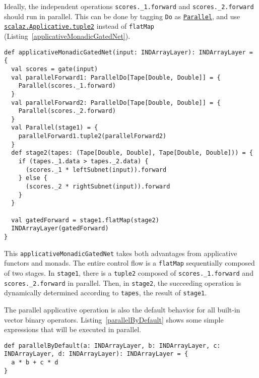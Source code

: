 Ideally, the independent operations \lstinline{scores._1.forward} and \lstinline{scores._2.forward} should run in parallel. This can be done by tagging \lstinline{Do} as \href{https://javadoc.io/page/org.scalaz/scalaz_2.11/latest/scalaz/Tags%24%24Parallel.html}{\lstinline{Parallel}}, and use \href{https://javadoc.io/page/org.scalaz/scalaz_2.11/latest/scalaz/Applicative.html#tuple2[A,B](fa:=>F[A],fb:=>F[B]):F[(A,B)]}{\lstinline{scalaz.Applicative.tuple2}} \cite{mcbride2008applicative} instead of \lstinline{flatMap} (Listing~\ref{applicativeMonadicGatedNet}).

\begin{lstlisting}[float={h t b p},caption={Applicative + monadic gated network}, label={applicativeMonadicGatedNet}]
def applicativeMonadicGatedNet(input: INDArrayLayer): INDArrayLayer = {
  val scores = gate(input)
  val parallelForward1: ParallelDo[Tape[Double, Double]] = {
    Parallel(scores._1.forward)
  }
  val parallelForward2: ParallelDo[Tape[Double, Double]] = {
    Parallel(scores._2.forward)
  }
  val Parallel(stage1) = {
  	parallelForward1.tuple2(parallelForward2)
  }
  def stage2(tapes: (Tape[Double, Double], Tape[Double, Double])) = {
    if (tapes._1.data > tapes._2.data) {
      (scores._1 * leftSubnet(input)).forward
    } else {
      (scores._2 * rightSubnet(input)).forward
    }
  }

  val gatedForward = stage1.flatMap(stage2)
  INDArrayLayer(gatedForward)
}
\end{lstlisting}

This \lstinline{applicativeMonadicGatedNet} takes both advantages from applicative functors and monads. The entire control flow is a \lstinline{flatMap} sequentially composed of two stages. In \lstinline{stage1}, there is a \lstinline{tuple2} composed of \lstinline{scores._1.forward} and \lstinline{scores._2.forward} in parallel. Then, in \lstinline{stage2}, the succeeding operation is dynamically determined according to \lstinline{tapes}, the result of \lstinline{stage1}.

The parallel applicative operation is also the default behavior for all built-in vector binary operators. Listing~\ref{parallelByDefault} shows some simple expressions that will be executed in parallel.

\begin{lstlisting}[float={h t b p},caption={By default, \lstinline{a * b} and \lstinline{c * d} will be executed in parallel because they are independent}, label={parallelByDefault}]
def parallelByDefault(a: INDArrayLayer, b: INDArrayLayer, c: INDArrayLayer, d: INDArrayLayer): INDArrayLayer = {
  a * b + c * d
}
\end{lstlisting}

